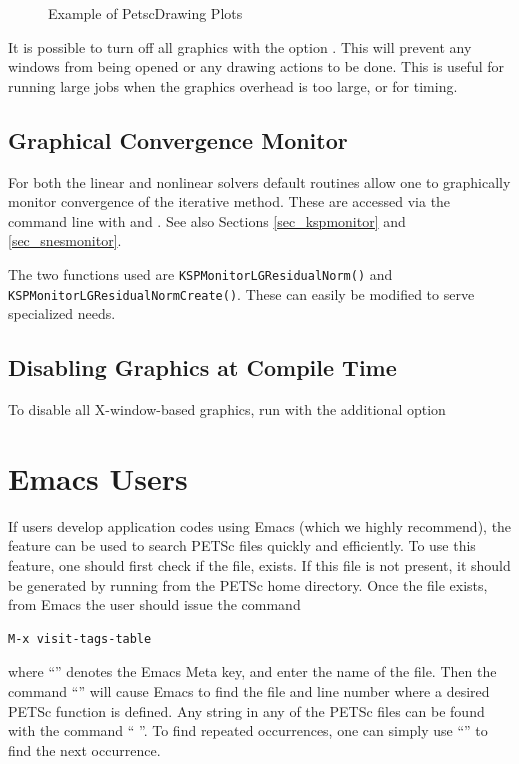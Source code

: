 {{{\begin{figure}[H]

\caption{Example of PetscDrawing Plots}
\label{fig_plot}
\end{figure}

It is possible to turn off all graphics with the option 
. This
will prevent any windows from being opened or any drawing actions to be done.
This is useful for running large jobs when the graphics overhead is too
large, or for timing.

\subsection{Graphical Convergence Monitor}
For both the linear and nonlinear solvers default routines
allow one to graphically monitor convergence of the iterative method.
These are accessed via the command line with
 and . 
 See also Sections \ref{sec_kspmonitor} and
\ref{sec_snesmonitor}.

The two functions used are \lstinline{KSPMonitorLGResidualNorm()}
and \break\lstinline{KSPMonitorLGResidualNormCreate()}. These
can easily be modified to serve specialized needs.

\subsection{Disabling Graphics at Compile Time}

To disable all X-window-based graphics, run  with the
additional option 

\section{Emacs Users}  \label{sec_emacs}

 
If users develop application codes  using Emacs (which we
highly recommend), the  feature can be used to search PETSc
files quickly and efficiently.  To use this feature, one should
first check if the file,
 exists.  If this file is
not present, it should be generated by
running   from the PETSc home directory.
Once the file exists, from
Emacs the user should issue
the command
\begin{lstlisting}
M-x visit-tags-table
\end{lstlisting}
 where ``''
denotes the Emacs Meta key, and enter the
name of the  file. Then the command ``'' will cause Emacs
to find the file and line number where a desired PETSc function
is defined.  Any string in any of the PETSc files can be found with the
command `` ''. To find repeated occurrences,
one can simply use ``'' to find the next occurrence.

}}}
